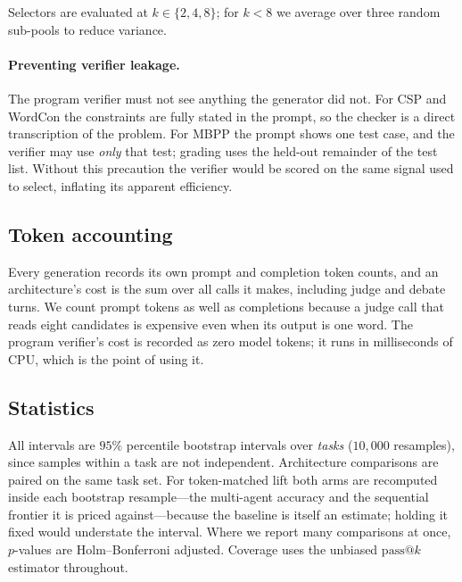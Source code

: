 Selectors are evaluated at $k \in \{2,4,8\}$; for $k<8$ we average over three
random sub-pools to reduce variance.

\paragraph{Preventing verifier leakage.}
The program verifier must not see anything the generator did not. For CSP and
WordCon the constraints are fully stated in the prompt, so the checker is a
direct transcription of the problem. For MBPP the prompt shows one test case,
and the verifier may use \emph{only} that test; grading uses the held-out
remainder of the test list. Without this precaution the verifier would be
scored on the same signal used to select, inflating its apparent efficiency.

\subsection{Token accounting}

Every generation records its own prompt and completion token counts, and an
architecture's cost is the sum over all calls it makes, including judge and
debate turns. We count prompt tokens as well as completions because a judge
call that reads eight candidates is expensive even when its output is one word.
The program verifier's cost is recorded as zero model tokens; it runs in
milliseconds of CPU, which is the point of using it.

\subsection{Statistics}

All intervals are $95\%$ percentile bootstrap intervals over \emph{tasks}
($10{,}000$ resamples), since samples within a task are not independent.
Architecture comparisons are paired on the same task set. For token-matched
lift both arms are recomputed inside each bootstrap resample---the multi-agent
accuracy and the sequential frontier it is priced against---because the
baseline is itself an estimate; holding it fixed would understate the interval.
Where we report many comparisons at once, $p$-values are Holm--Bonferroni
adjusted. Coverage uses the unbiased $\mathrm{pass}@k$ estimator throughout.
